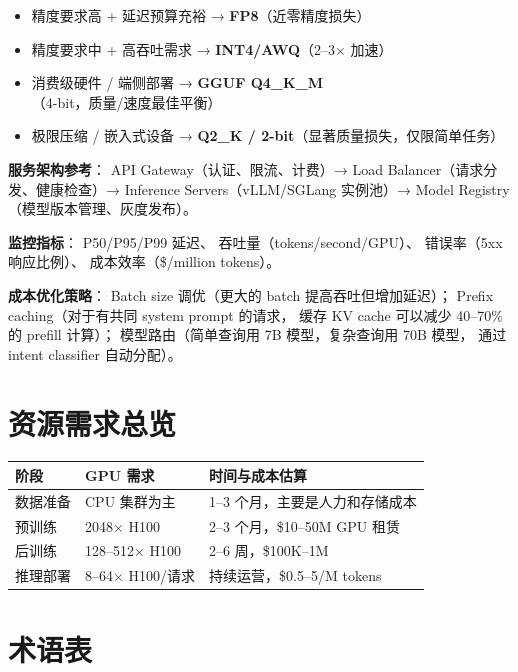 \begin{keybox}[量化级别决策树]
\begin{itemize}[noitemsep]
  \item 精度要求高 + 延迟预算充裕 → \textbf{FP8}（近零精度损失）
  \item 精度要求中 + 高吞吐需求 → \textbf{INT4/AWQ}（2--3$\times$ 加速）
  \item 消费级硬件 / 端侧部署 → \textbf{GGUF Q4\_K\_M}（4-bit，质量/速度最佳平衡）
  \item 极限压缩 / 嵌入式设备 → \textbf{Q2\_K / 2-bit}（显著质量损失，仅限简单任务）
\end{itemize}
\end{keybox}

\textbf{服务架构参考}：
API Gateway（认证、限流、计费）→
Load Balancer（请求分发、健康检查）→
Inference Servers（vLLM/SGLang 实例池）→
Model Registry（模型版本管理、灰度发布）。

\textbf{监控指标}：
P50/P95/P99 延迟、
吞吐量（tokens/second/GPU）、
错误率（5xx 响应比例）、
成本效率（\$/million tokens）。

\textbf{成本优化策略}：
Batch size 调优（更大的 batch 提高吞吐但增加延迟）；
Prefix caching（对于有共同 system prompt 的请求，
缓存 KV cache 可以减少 40--70\% 的 prefill 计算）；
模型路由（简单查询用 7B 模型，复杂查询用 70B 模型，
通过 intent classifier 自动分配）。

\section{资源需求总览}

\begin{corebox}
\begin{tabularx}{\linewidth}{l l X}
\toprule
\textbf{阶段} & \textbf{GPU 需求} & \textbf{时间与成本估算} \\
\midrule
数据准备    & CPU 集群为主  & 1--3 个月，主要是人力和存储成本 \\
预训练      & 2048$\times$ H100   & 2--3 个月，\$10--50M GPU 租赁 \\
后训练      & 128--512$\times$ H100 & 2--6 周，\$100K--1M \\
推理部署    & 8--64$\times$ H100/请求 & 持续运营，\$0.5--5/M tokens \\
\bottomrule
\end{tabularx}
\end{corebox}

\section{术语表}

